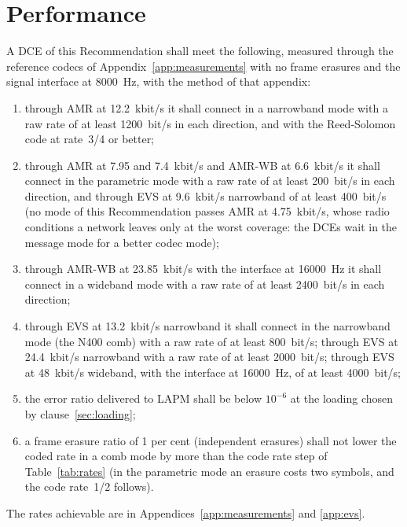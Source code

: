 \documentclass[a4paper,11pt]{article}
\newcounter{annex}
\newcounter{appendix}
\newcommand{\kbs}{kbit/s}
\begin{document}
\section{Performance}\label{sec:performance}
A DCE of this Recommendation shall meet the following, measured through
the reference codecs of Appendix~\ref{app:measurements} with no frame
erasures and the signal interface at 8000~Hz, with the method of that
appendix:
\begin{enumerate}[label=\alph*)]
\item through AMR at 12.2~\kbs{} it shall connect in a narrowband mode
  with a raw rate of at least 1200~bit/s in each direction, and with the
  Reed-Solomon code at rate~3/4 or better;
\item through AMR at 7.95 and 7.4~\kbs{} and AMR-WB at 6.6~\kbs{} it
  shall connect in the parametric mode with a raw rate of at least
  200~bit/s in each direction, and through EVS at 9.6~\kbs{} narrowband
  of at least 400~bit/s (no mode of this Recommendation passes AMR at
  4.75~\kbs{}, whose radio conditions a network leaves only at the worst
  coverage: the DCEs wait in the message mode for a better codec mode);
\item through AMR-WB at 23.85~\kbs{} with the interface at 16000~Hz it
  shall connect in a wideband mode with a raw rate of at least
  2400~bit/s in each direction;
\item through EVS at 13.2~\kbs{} narrowband it shall connect in the
  narrowband mode (the N400 comb) with a raw rate of at least 800~bit/s;
  through EVS at 24.4~\kbs{} narrowband with a raw rate of at least
  2000~bit/s; through EVS at 48~\kbs{} wideband, with the interface at
  16000~Hz, of at least 4000~bit/s;
\item the error ratio delivered to LAPM shall be below $10^{-6}$ at the
  loading chosen by clause~\ref{sec:loading};
\item a frame erasure ratio of 1 per cent (independent erasures) shall
  not lower the coded rate in a comb mode by more than the code rate
  step of Table~\ref{tab:rates} (in the parametric mode an erasure costs
  two symbols, and the code rate~1/2 follows).
\end{enumerate}
The rates achievable are in Appendices~\ref{app:measurements} and
\ref{app:evs}.





\clearpage
{}
\end{document}
